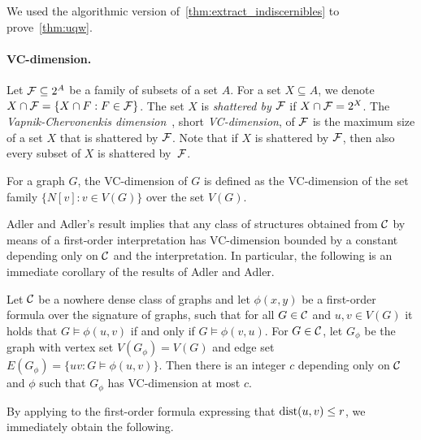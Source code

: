 We used the algorithmic version of~\cref{thm:extract_indiscernibles} 
to prove~\cref{thm:uqw}.

\paragraph{VC-dimension.}

Let $\mathcal{F}\subseteq 2^A$ be a family of
subsets of a set $A$. For a set $X\subseteq A$, we denote $X\cap \mathcal{F}=\{X\cap F : F\in \mathcal{F}\}$.
The set $X$ is \emph{shattered by $\mathcal{F}$} if $X\cap \mathcal{F}=2^X$.
The \emph{Vapnik-Chervonenkis dimension}~\cite{chervonenkis1971theory}, 
short \emph{VC-dimension},
of $\mathcal{F}$ is the maximum size of a set $X$ that is shattered by
$\mathcal{F}$. Note that if $X$ is shattered by $\mathcal{F}$, then also every
subset of $X$ is shattered by~$\mathcal{F}$.

For a graph $G$, the VC-dimension of $G$ is defined as the VC-dimension
of the set family $\{N[v]\colon v\in V(G)\}$ over the set $V(G)$.

Adler and Adler's result implies that any class of structures
obtained from $\mathcal{C}$ by means of a first-order interpretation has VC-dimension
bounded by a constant depending only on $\mathcal{C}$ and the interpretation.
In particular, the following is an immediate corollary of the results of Adler and Adler.

\begin{theorem}\label{thm:adler}
  Let $\mathcal{C}$ be a nowhere dense class of graphs and let $\phi(x,y)$ be
  a first-order formula over the signature of graphs,
  such that for all $G \in \mathcal{C}$ and $u,v\in
  V(G)$ it holds that $G\models\phi(u,v)$ if and only if $G\models\phi(v,u)$. 
  For $G\in \mathcal{C}$, let $G_\phi$ be the graph with
  vertex set $V(G_\phi)=V(G)$ and edge set $E(G_\phi)=\{uv \colon
  G\models\phi(u,v)\}$. Then there is an integer $c$ depending only on
  $\mathcal{C}$ and $\phi$ such that $G_\phi$ has VC-dimension at most $c$.
\end{theorem}

By applying  to the first-order formula 
expressing that $\mathrm{dist}(u,v)\leq r$,
we immediately obtain the following.


